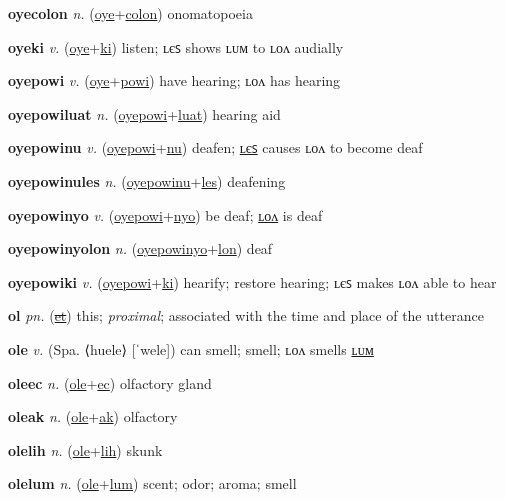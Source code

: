 \textbf{\hypertarget{oyecolon}{oyecolon}} \textit{n.} (\hyperlink{oye}{oye}+\allowbreak \hyperlink{colon}{colon})
onomatopoeia

\textbf{\hypertarget{oyeki}{oyeki}} \textit{v.} (\hyperlink{oye}{oye}+\allowbreak \hyperlink{ki}{ki})
listen; ʟєꜱ shows ʟᴜᴍ to ʟᴏᴧ audially

\textbf{\hypertarget{oyepowi}{oyepowi}} \textit{v.} (\hyperlink{oye}{oye}+\allowbreak \hyperlink{powi}{powi})
have hearing; ʟᴏᴧ has hearing

\textbf{\hypertarget{oyepowiluat}{oyepowiluat}} \textit{n.} (\hyperlink{oyepowi}{oyepowi}+\allowbreak \hyperlink{luat}{luat})
hearing aid

\textbf{\hypertarget{oyepowinu}{oyepowinu}} \textit{v.} (\hyperlink{oyepowi}{oyepowi}+\allowbreak \hyperlink{nu}{nu})
deafen; \hyperlink{oyepowinules}{ʟєꜱ} causes ʟᴏᴧ to become deaf

\textbf{\hypertarget{oyepowinules}{oyepowinules}} \textit{n.} (\hyperlink{oyepowinu}{oyepowinu}+\allowbreak \hyperlink{les}{les})
deafening

\textbf{\hypertarget{oyepowinyo}{oyepowinyo}} \textit{v.} (\hyperlink{oyepowi}{oyepowi}+\allowbreak \hyperlink{nyo}{nyo})
be deaf; \hyperlink{oyepowinyolon}{ʟᴏᴧ} is deaf

\textbf{\hypertarget{oyepowinyolon}{oyepowinyolon}} \textit{n.} (\hyperlink{oyepowinyo}{oyepowinyo}+\allowbreak \hyperlink{lon}{lon})
deaf

\textbf{\hypertarget{oyepowiki}{oyepowiki}} \textit{v.} (\hyperlink{oyepowi}{oyepowi}+\allowbreak \hyperlink{ki}{ki})
hearify; restore hearing; ʟєꜱ makes ʟᴏᴧ able to hear

\textbf{\hypertarget{ol}{ol}} \textit{pn.} (\hyperlink{et}{\sout{et}})
this; \textit{proximal}; associated with the time and place of the utterance

\textbf{\hypertarget{ole}{ole}} \textit{v.} (Spa. ⟨huele⟩ [ˈwele])
can smell; smell; ʟᴏᴧ smells \hyperlink{olelum}{ʟᴜᴍ}

\textbf{\hypertarget{oleec}{oleec}} \textit{n.} (\hyperlink{ole}{ole}+\allowbreak \hyperlink{ec}{ec})
olfactory gland

\textbf{\hypertarget{oleak}{oleak}} \textit{n.} (\hyperlink{ole}{ole}+\allowbreak \hyperlink{ak}{ak})
olfactory

\textbf{\hypertarget{olelih}{olelih}} \textit{n.} (\hyperlink{ole}{ole}+\allowbreak \hyperlink{lih}{lih})
skunk

\textbf{\hypertarget{olelum}{olelum}} \textit{n.} (\hyperlink{ole}{ole}+\allowbreak \hyperlink{lum}{lum})
scent; odor; aroma; smell

